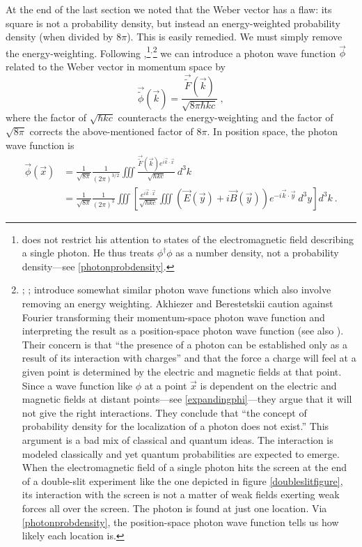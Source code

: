 \documentclass[12pt,secnumarabic,amsmath,amssymb,balancelastpage,nofootinbib]{article}
\begin{document}
At the end of the last section we noted that the Weber vector has a flaw: its square is not a probability density, but instead an energy-weighted probability density (when divided by $8 \pi$).  This is easily remedied.  We must simply remove the energy-weighting.  Following \citet{good1957},\footnote{\citet{good1957} does not restrict his attention to states of the electromagnetic field describing a single photon.  He thus treats $\phi^\dagger \phi$ as a number density, not a probability density---see \eqref{photonprobdensity}.}$^,$\footnote{\citet[pg.\ 191]{pauli}; \citet[eq.\ 1.6]{ab1965}; \citet[pg.\ 637]{mandelwolf} introduce somewhat similar photon wave functions which also involve removing an energy weighting.  Akhiezer and Berestetskii caution against Fourier transforming their momentum-space photon wave function and interpreting the result as a position-space photon wave function (see also \citealp{pauli}).  Their concern is that ``the presence of a photon can be established only as a result of its interaction with charges'' and that the force a charge will feel at a given point is determined by the electric and magnetic fields at that point.  Since a wave function like $\phi$ at a point $\vec{x}$ is dependent on the electric and magnetic fields at distant points---see \eqref{expandingphi}---they argue that it will not give the right interactions.  They conclude that ``the concept of probability density for the localization of a photon does not exist.''  This argument is a bad mix of classical and quantum ideas.  The interaction is modeled classically and yet quantum probabilities are expected to emerge.  When the electromagnetic field of a single photon hits the screen at the end of a double-slit experiment like the one depicted in figure \ref{doubleslitfigure}, its interaction with the screen is not a matter of weak fields exerting weak forces all over the screen.  The photon is found at just one location.  Via \eqref{photonprobdensity}, the position-space photon wave function tells us how likely each location is.} we can introduce a photon wave function $\vec{\phi}$ related to the Weber vector in momentum space by
\begin{equation}
\vec{\widetilde{\phi}}(\vec{k})=\frac{\vec{\widetilde{F}}(\vec{k})}{\sqrt{8\pi\hbar k c}}
\ ,
\label{defofphi}
\end{equation}
where the factor of $\sqrt{\hbar k c}$ counteracts the energy-weighting and the factor of $\sqrt{8\pi}$ corrects the above-mentioned factor of $8 \pi$.  In position space, the photon wave function is
\begin{align}
\vec{\phi}(\vec{x})&=\frac{1}{\sqrt{8\pi}}\frac{1}{(2\pi)^{3/2}}\iiint{ \frac{\vec{\widetilde{F}}(\vec{k}) e^{i \vec{k}\cdot\vec{x}}}{\sqrt{\hbar k c}} \: d^3 k }
\nonumber
\\
&=\frac{1}{\sqrt{8\pi}}\frac{1}{(2\pi)^3}\iiint{ \left[ \frac{e^{i \vec{k}\cdot\vec{x}}}{\sqrt{\hbar k c}} \iiint{\left(\vec{E}(\vec{y})+i\vec{B}(\vec{y})\right)e^{-i \vec{k}\cdot\vec{y}} \: d^3 y }\right] d^3 k}
\label{expandingphi}
\ .
\end{align}
\end{document}
